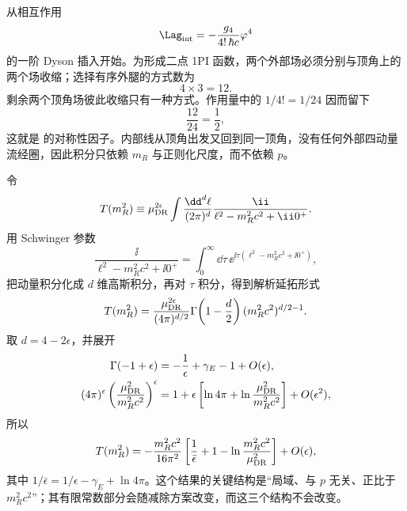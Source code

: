 \begin{exbox}
从相互作用
\begin{equation*}
 \Lag_{\rm int}
 =-\frac{g_4}{4!\,\hbar c}\varphi^4
\end{equation*}
的一阶 Dyson 插入开始。为形成二点 1PI 函数，两个外部场必须分别与顶角上的两个场收缩；选择有序外腿的方式数为
\begin{equation*}
 4\times3=12.
\end{equation*}
剩余两个顶角场彼此收缩只有一种方式。作用量中的 $1/4!=1/24$ 因而留下
\begin{equation*}
 \frac{12}{24}=\frac12,
\end{equation*}
这就是 的对称性因子。内部线从顶角出发又回到同一顶角，没有任何外部四动量流经圈，因此积分只依赖 $m_R$ 与正则化尺度，而不依赖 $p$。

令
\begin{equation*}
 T(m_R^2)
 \equiv
 \mu_{\rm DR}^{2\epsilon}
 \int\frac{\dd^d \ell}{(2\pi)^d}
 \frac{\ii}{\ell^2-m_R^2c^2+\ii0^+}.
\end{equation*}
用 Schwinger 参数
\begin{equation*}
 \frac{\ii}{\ell^2-m_R^2c^2+\ii0^+}
 =\int_0^\infty\dd\tau\,
 \ee^{\ii\tau(\ell^2-m_R^2c^2+\ii0^+)},
\end{equation*}
把动量积分化成 $d$ 维高斯积分，再对 $\tau$ 积分，得到解析延拓形式
\begin{equation*}
 T(m_R^2)
 =\frac{\mu_{\rm DR}^{2\epsilon}}
 {(4\pi)^{d/2}}
 \Gamma\!\left(1-\frac d2\right)
 (m_R^2c^2)^{d/2-1}.
\end{equation*}
取 $d=4-2\epsilon$，并展开
\begin{align*}
 \Gamma(-1+\epsilon)
 &=-\frac1\epsilon+\gamma_E-1+O(\epsilon),\\
 (4\pi)^\epsilon
 \left(\frac{\mu_{\rm DR}^2}{m_R^2c^2}\right)^\epsilon
 &=1+\epsilon
 \left[
 \ln4\pi+\ln\frac{\mu_{\rm DR}^2}{m_R^2c^2}
 \right]+O(\epsilon^2),
\end{align*}
所以
\begin{equation*}
 T(m_R^2)
 =-\frac{m_R^2c^2}{16\pi^2}
 \left[
 \frac1{\bar\epsilon}
 +1-\ln\frac{m_R^2c^2}{\mu_{\rm DR}^2}
 \right]
 +O(\epsilon),
\end{equation*}
其中 $1/\bar\epsilon=1/\epsilon-\gamma_E+\ln4\pi$。这个结果的关键结构是“局域、与 $p$ 无关、正比于 $m_R^2c^2$”；其有限常数部分会随减除方案改变，而这三个结构不会改变。


\end{exbox}
